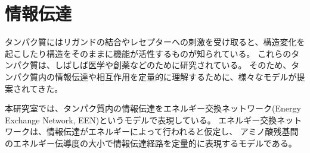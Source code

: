 
\section{情報伝達}
タンパク質にはリガンドの結合やレセプターへの刺激を受け取ると、構造変化を起こしたり構造をそのままに機能が活性するものが知られている。
これらのタンパク質は、しばしば医学や創薬などのために研究されている。
そのため、タンパク質内の情報伝達や相互作用を定量的に理解するために、様々なモデルが提案されてきた。%

本研究室では、タンパク質内の情報伝達をエネルギー交換ネットワーク(Energy Exchange Network, EEN)というモデルで表現している。
エネルギー交換ネットワークは、情報伝達がエネルギーによって行われると仮定し、
アミノ酸残基間のエネルギー伝導度の大小で情報伝達経路を定量的に表現するモデルである。